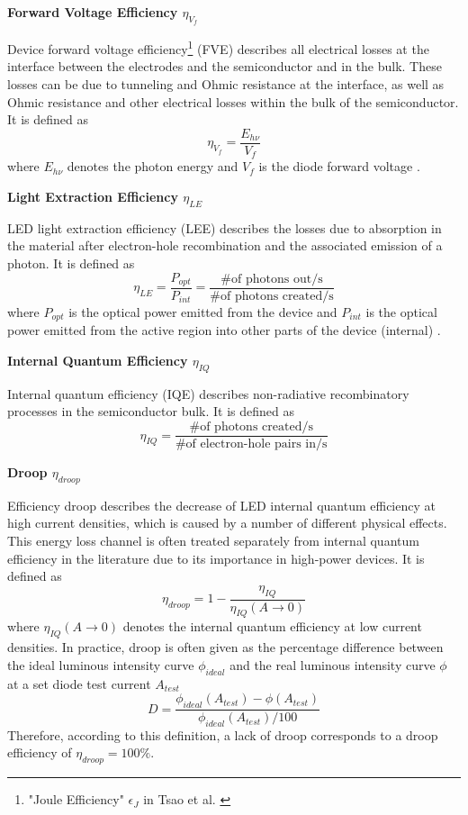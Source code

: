 \documentclass[parskip=full]{article}
\begin{document}
\textbf{Forward Voltage Efficiency $\eta_{V_f}$}

Device forward voltage efficiency\footnote{"Joule Efficiency" $\epsilon_J$ in Tsao et al. \cite{tsao2010solid}} (FVE) describes all electrical losses at the interface between the electrodes and the semiconductor and in the bulk. These losses can be due to tunneling and Ohmic resistance at the interface, as well as Ohmic resistance and other electrical losses within the bulk of the semiconductor. It is defined as
%
\begin{equation}
    \eta_{V_f} = \frac{E_{h\nu}}{V_f}
\end{equation}
%
where $E_{h\nu}$ denotes the photon energy and $V_f$ is the diode forward voltage \cite{schubert2018light}\cite{tsao2010solid}.

\textbf{Light Extraction Efficiency $\eta_{LE}$}

LED light extraction efficiency (LEE) describes the  losses due to absorption in the material after electron-hole recombination and the associated emission of a photon. It is defined as
%
\begin{equation}
    \eta_{LE} = \frac{P_{opt}}{P_{int}} = \frac{\text{\# of photons out/s}}{\text{\# of photons created/s}}
\end{equation}
%
where $P_{opt}$ is the optical power emitted from the device and  $P_{int}$ is the optical power emitted from the active region into other parts of the device (internal) \cite{schubert2018light}\cite{tsao2010solid}.

\textbf{Internal Quantum Efficiency $\eta_{IQ}$}

Internal quantum efficiency (IQE) describes non-radiative recombinatory processes in the semiconductor bulk. It is defined as
%
\begin{equation}
    \eta_{IQ} = \frac{\# \text{of photons created/s}}{\# \text{of electron-hole pairs in/s}}
\end{equation}

\textbf{Droop $\eta_{droop}$}

Efficiency droop describes the decrease of LED internal quantum efficiency at high current densities, which is caused by a number of different physical effects\cite{David2020}. This energy loss channel is often treated separately from internal quantum efficiency in the literature due to its importance in high-power devices. It is defined as
%
\begin{equation}
    \eta_{droop} = 1 - \frac{\eta_{IQ}}{\eta_{IQ}(A \rightarrow 0)}
\end{equation}
%
where $\eta_{IQ}(A \rightarrow 0)$ denotes the internal quantum efficiency at low current densities. In practice, droop is often given as the percentage difference between the ideal luminous intensity curve $\phi_{ideal}$ and the real luminous intensity curve $\phi$ at a set diode test current $A_{test}$
%
\begin{equation}
\label{eqn:droop}
    D = \frac{\phi_{ideal}(A_{test})-\phi(A_{test})}{\phi_{ideal}(A_{test})/100}
\end{equation}
%
Therefore, according to this definition, a lack of droop corresponds to a droop efficiency of $\eta_{droop} = 100\%$\cite{schubert2018light}\cite{tsao2010solid}.
\end{document}
